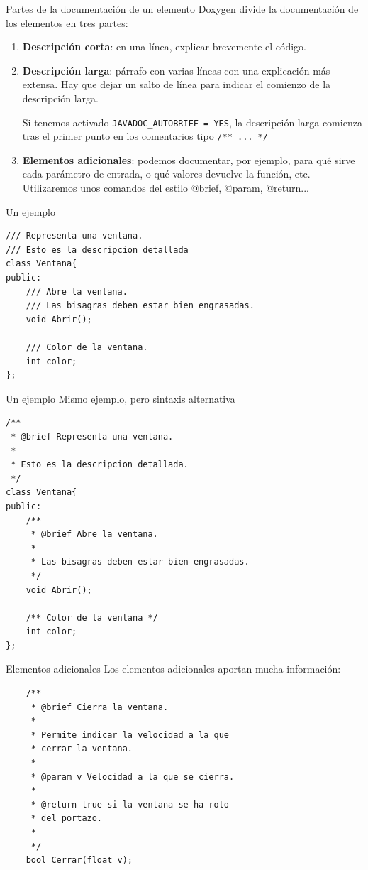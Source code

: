 \documentclass{beamer}
\begin{document}
\begin{frame}{Partes de la documentación de un elemento}
  Doxygen divide la documentación de los elementos en tres partes:
  \begin{enumerate}
  \item \textbf{Descripción corta}: en una línea, explicar brevemente el código.
  \item \textbf{Descripción larga}: párrafo con varias líneas con una
    explicación más extensa. Hay que dejar un salto de línea para indicar el
    comienzo de la descripción larga. 


    Si tenemos activado \texttt{JAVADOC\_AUTOBRIEF = YES}, la descripción larga
    comienza tras el primer punto en los comentarios tipo \texttt{/** ... */}
  \item \textbf{Elementos adicionales}: podemos documentar, por ejemplo, para
    qué sirve cada parámetro de entrada, o qué valores devuelve la función,
    etc. Utilizaremos unos comandos del estilo @brief, @param, @return...
  \end{enumerate}
\end{frame}

\begin{frame}[fragile=singleslide]{Un ejemplo}

\begin{lstlisting}
/// Representa una ventana. 
/// Esto es la descripcion detallada
class Ventana{
public:
    /// Abre la ventana. 
    /// Las bisagras deben estar bien engrasadas.
    void Abrir();

    /// Color de la ventana.
    int color;
};
\end{lstlisting}
\end{frame}

\begin{frame}[fragile=singleslide]{Un ejemplo}
Mismo ejemplo, pero sintaxis alternativa
\begin{lstlisting}
/** 
 * @brief Representa una ventana. 
 * 
 * Esto es la descripcion detallada.
 */
class Ventana{
public:
    /**
     * @brief Abre la ventana.
     *
     * Las bisagras deben estar bien engrasadas.
     */
    void Abrir();

    /** Color de la ventana */
    int color;
};
\end{lstlisting}
\end{frame}


\begin{frame}[fragile=singleslide]{Elementos adicionales}
Los elementos adicionales aportan mucha información:
\begin{lstlisting}
    /**
     * @brief Cierra la ventana.
     *
     * Permite indicar la velocidad a la que 
     * cerrar la ventana.
     *
     * @param v Velocidad a la que se cierra.
     * 
     * @return true si la ventana se ha roto 
     * del portazo.
     *
     */
    bool Cerrar(float v);
\end{lstlisting}
\end{frame}
\end{document}
